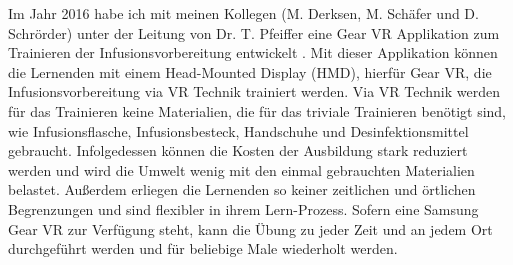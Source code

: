 Im Jahr 2016 habe ich mit meinen Kollegen (M. Derksen, M. Schäfer und D. Schrörder) unter der Leitung von Dr. T. Pfeiffer eine Gear VR Applikation zum Trainieren der Infusionsvorbereitung entwickelt \citep{26}. Mit dieser Applikation können die Lernenden mit einem Head-Mounted Display (HMD), hierfür Gear VR, die Infusionsvorbereitung via VR Technik trainiert werden. Via VR Technik werden für das Trainieren keine Materialien, die für das triviale Trainieren benötigt sind, wie Infusionsflasche, Infusionsbesteck, Handschuhe und Desinfektionsmittel gebraucht. Infolgedessen können die Kosten der Ausbildung stark reduziert werden und wird die Umwelt wenig mit den einmal gebrauchten Materialien belastet.
Außerdem erliegen die Lernenden so keiner zeitlichen und örtlichen Begrenzungen und sind flexibler in ihrem Lern-Prozess. Sofern eine Samsung Gear VR zur Verfügung steht, kann die Übung zu jeder Zeit und an jedem Ort durchgeführt werden und für beliebige Male wiederholt werden.

